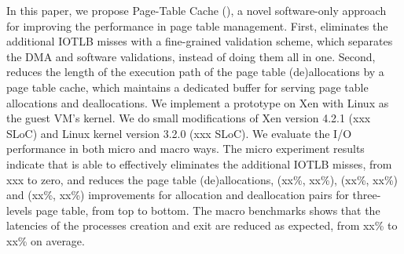 \documentclass[letterpaper,twocolumn,10pt]{article}
\begin{document}
In this paper, we propose Page-Table Cache (\name), a novel software-only approach for improving the performance in page table management.
First, \name eliminates the additional IOTLB misses with a fine-grained validation scheme, which separates the DMA and software validations, instead of doing them all in one.
Second, \name reduces the length of the execution path of the page table (de)allocations by a page table cache, which maintains a dedicated buffer for serving page table allocations and deallocations.
We implement a prototype on Xen with Linux as the guest VM's kernel. We do small modifications of Xen version 4.2.1 (xxx SLoC) and Linux kernel version 3.2.0 (xxx SLoC).
We evaluate the I/O performance in both micro and macro ways.
The micro experiment results indicate that \name is able to effectively eliminates the additional IOTLB misses, from xxx to zero, and reduces the page table (de)allocations, (xx\%, xx\%), (xx\%, xx\%) and (xx\%, xx\%) improvements for allocation and deallocation pairs for three-levels page table, from top to bottom.
The macro benchmarks shows that the latencies of the processes creation and exit are reduced as expected, from xx\% to xx\% on average.






%




%
%






{


}
\end{document}
